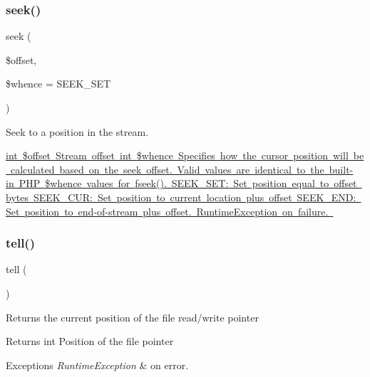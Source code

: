 \subsubsection{\texorpdfstring{seek()}{seek()}}
{\footnotesize\ttfamily seek (\begin{DoxyParamCaption}\item[{}]{\$offset,  }\item[{}]{\$whence = {\ttfamily SEEK\+\_\+SET} }\end{DoxyParamCaption})}

Seek to a position in the stream.

\mbox{\hyperlink{}{int \$offset Stream offset  int \$whence Specifies how the cursor position will be calculated based on the seek offset. Valid values are identical to the built-\/in P\+HP \$whence values for {\ttfamily fseek()}. S\+E\+E\+K\+\_\+\+S\+E\+T\+: Set position equal to offset bytes S\+E\+E\+K\+\_\+\+C\+U\+R\+: Set position to current location plus offset S\+E\+E\+K\+\_\+\+E\+N\+D\+: Set position to end-\/of-\/stream plus offset.  Runtime\+Exception on failure. }}\mbox{\label{class_pes_1_1_http_1_1_stream_a8153e55ed7b27a62988843a2dd66c845}} 
\subsubsection{\texorpdfstring{tell()}{tell()}}
{\footnotesize\ttfamily tell (\begin{DoxyParamCaption}{ }\end{DoxyParamCaption})}

Returns the current position of the file read/write pointer

\begin{DoxyReturn}{Returns}
int Position of the file pointer
\end{DoxyReturn}

\begin{DoxyExceptions}{Exceptions}
{\em Runtime\+Exception} & on error. \\
\hline
\end{DoxyExceptions}
\mbox{\label{class_pes_1_1_http_1_1_stream_abf9a4eaa4b5194cc450e80c1a0c23a5a}} 
